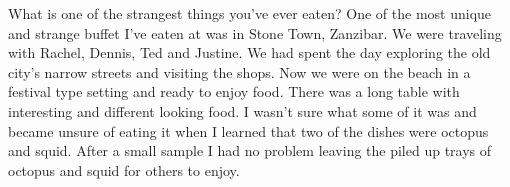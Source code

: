 What is one of the strangest things you've ever eaten?
One of the most unique and strange buffet I've eaten at was in Stone Town, Zanzibar. We were traveling with Rachel, Dennis, Ted and Justine. We had spent the day exploring the old city's narrow streets and visiting the shops. 
Now we were on the beach in a festival type setting and ready to enjoy food. There was a long table with interesting and different looking food. I wasn't sure what some of it was and became unsure of eating it when I learned that two of the dishes were octopus and squid. After a small sample I had no problem leaving the piled up trays of octopus and squid for others to enjoy.








